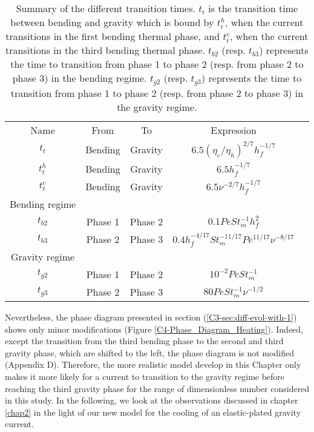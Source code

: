 \begin{table}[htpb]
  \begin{center}
    \begin{tabular}{ccccc}
      Name&From&To&Expression\\
      $t_t$&Bending&Gravity&$6.5(\eta_e/\eta_h)^{2/7}h_f^{-1/7}$\\
      $t_t^h$&Bending&Gravity&$6.5h_f^{-1/7}$\\
      $t_t^c$&Bending&Gravity&$6.5\nu^{-2/7}h_f^{-1/7}$\\
      Bending regime&\multicolumn{3}{c}{} \\
      $t_{b2}$&Phase 1& Phase 2&$0.1 Pe St_m^{-1} h_f^2$\\
      $t_{b3}$&Phase 2& Phase 3 &$0.4 h_f^{-4/17} St_m^{-11/17}Pe^{11/17}\nu^{-8/17}$\\
      Gravity regime&\multicolumn{3}{c}{} \\
      $t_{g2}$ &Phase 1& Phase 2 &$10^{-2}PeSt_m^{-1}$\\
      $t_{g3}$ &Phase 2& Phase 3 &$ 80Pe St_m^{-1}\nu^{-1/2}$\\
    \end{tabular}
    \caption{Summary of the different  transition times.  $t_t$ is the
      transition time  between bending and  gravity which is  bound by
      $t_t^h$,  when  the current  transitions  in  the first  bending
      thermal phase, and $t_t^c$, when  the current transitions in the
      third  bending   thermal  phase.   $t_{b2}$   (resp.   $t_{b3}$)
      represents  the time  to  transition  from phase  1  to phase  2
      (resp. from phase 2 to phase  3) in the bending regime. $t_{g2}$
      (resp. $t_{g3}$) represents the time  to transition from phase 1
      to  phase 2  (resp. from  phase  2 to  phase 3)  in the  gravity
      regime. }
    \label{tab:TimeTransition}
  \end{center}
\end{table}

Nevertheless,    the    phase    diagram    presented    in    section
(\ref{C3-sec:diff-evol-with-1}) shows only minor modifications (Figure
\ref{C4-Phase_Diagram_Heating}).  Indeed,  except the  transition from
the third bending  phase to the second and third  gravity phase, which
are shifted to  the left, the phase diagram is  not modified (Appendix
D).  Therefore, the more realistic  model develop in this Chapter only
makes it more likely for a current to transition to the gravity regime
before reaching the third gravity phase for the range of dimensionless
number considered  in this  study. In  the following,  we look  at the
observations discussed in chapter \ref{chap2}  in the light of our new
model for the cooling of an elastic-plated gravity current.

